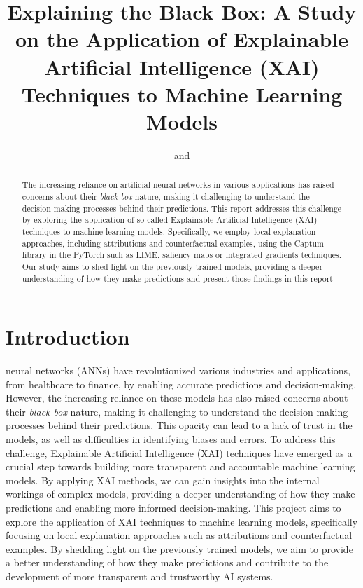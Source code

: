 \documentclass[journal, a4paper]{IEEEtran}
\begin{document}
\title{Explaining the Black Box: A Study on the Application of Explainable Artificial Intelligence (XAI) Techniques to Machine Learning Models}
\author{
    \large
    and
    \\[1ex]
    \normalsize
}


\maketitle

\begin{abstract}
    The increasing reliance on artificial neural networks in various applications has raised concerns about their \textit{black box} nature, making it challenging to understand the decision-making processes behind their predictions.
    This report addresses this challenge by exploring the application of so-called Explainable Artificial Intelligence (XAI) techniques to machine learning models.
    Specifically, we employ local explanation approaches, including attributions and counterfactual examples, using the Captum library in the PyTorch such as LIME, saliency maps or integrated gradients techniques.
    Our study aims to shed light on the previously trained models, providing a deeper understanding of how they make predictions and present those findings in this report
\end{abstract}

\section{Introduction}\label{sec:introduction}

 neural networks (ANNs) have revolutionized various industries and applications, from healthcare to finance, by enabling accurate predictions and decision-making.
However, the increasing reliance on these models has also raised concerns about their \textit{black box} nature, making it challenging to understand the decision-making processes behind their predictions.
This opacity can lead to a lack of trust in the models, as well as difficulties in identifying biases and errors.
To address this challenge, Explainable Artificial Intelligence (XAI) techniques have emerged as a crucial step towards building more transparent and accountable machine learning models.
By applying XAI methods, we can gain insights into the internal workings of complex models, providing a deeper understanding of how they make predictions and enabling more informed decision-making.
This project aims to explore the application of XAI techniques to machine learning models, specifically focusing on local explanation approaches such as attributions and counterfactual examples.
By shedding light on the previously trained models, we aim to provide a better understanding of how they make predictions and contribute to the development of more transparent and trustworthy AI systems.
\end{document}

